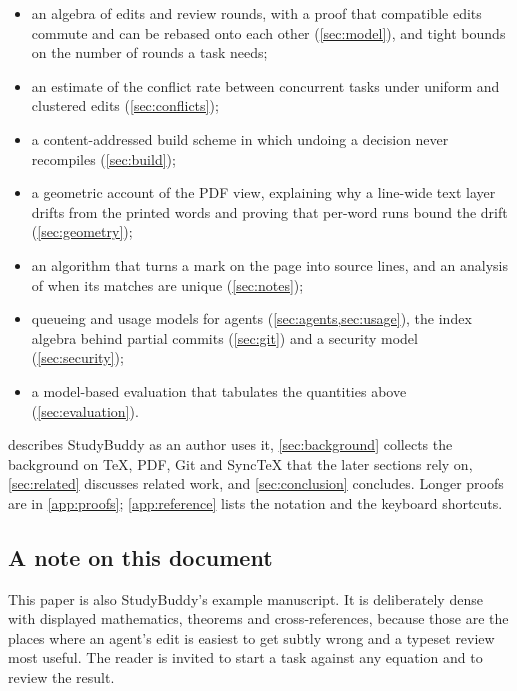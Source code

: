 \begin{itemize}
  \item an algebra of edits and review rounds, with a proof that compatible
    edits commute and can be rebased onto each other (\cref{sec:model}), and
    tight bounds on the number of rounds a task needs;
  \item an estimate of the conflict rate between concurrent tasks under uniform
    and clustered edits (\cref{sec:conflicts});
  \item a content-addressed build scheme in which undoing a decision never
    recompiles (\cref{sec:build});
  \item a geometric account of the PDF view, explaining why a line-wide text
    layer drifts from the printed words and proving that per-word runs bound
    the drift (\cref{sec:geometry});
  \item an algorithm that turns a mark on the page into source lines, and an
    analysis of when its matches are unique (\cref{sec:notes});
  \item queueing and usage models for agents (\cref{sec:agents,sec:usage}),
    the index algebra behind partial commits (\cref{sec:git}) and a security
    model (\cref{sec:security});
  \item a model-based evaluation that tabulates the quantities above
    (\cref{sec:evaluation}).
\end{itemize}

 describes StudyBuddy as an author uses it, \cref{sec:background}
collects the background on \TeX{}, PDF, Git and SyncTeX that the later sections
rely on, \cref{sec:related} discusses related
work, and \cref{sec:conclusion} concludes. Longer proofs are in
\cref{app:proofs}; \cref{app:reference} lists the notation and the keyboard
shortcuts.

\subsection{A note on this document}

This paper is also StudyBuddy's example manuscript. It is deliberately dense with
displayed mathematics, theorems and cross-references, because those are the
places where an agent's edit is easiest to get subtly wrong and a typeset
review most useful. The reader is invited to start a task against any equation
and to review the result.
